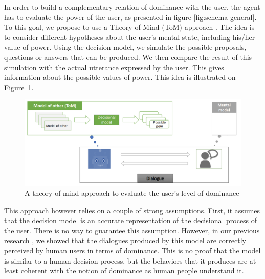 \documentclass[sigconf]{aamas}  %
\begin{document}
	In order to build a complementary relation of dominance with the user, the agent has to evaluate the power of the user, as presented in figure \ref{fig:schema-general}. To this goal, we propose to use a Theory of Mind (ToM) approach \cite{premack1978does}. The idea is to consider different hypotheses about the user's mental state, including his/her value of power. Using the decision model, we simulate the possible proposals, questions or answers that can be produced. We then compare the result of this simulation with the actual utterance expressed by the user. This gives information about the possible values of power. This idea is illustrated on Figure~\ref{fig:tom}.
		
	\begin{figure}
			\includegraphics[width=\linewidth, height= 0.32\textheight]{figs/tom.png}
			\caption{A theory of mind approach to evaluate the user's level of dominance} 
			\label{fig:tom}
	\end{figure} 

	This approach however relies on a couple of strong assumptions. First, it assumes that the decision model is an accurate representation of the decisional process of the user. There is no way to guarantee this assumption. However, in our previous research \cite{ouali2017computational}, we showed that the dialogues produced by this model are correctly perceived by human users in terms of dominance. This is no proof that the model is similar to a human decision process, but the behaviors that it produces are at least coherent with the notion of dominance as human people understand it.
	
\end{document}
